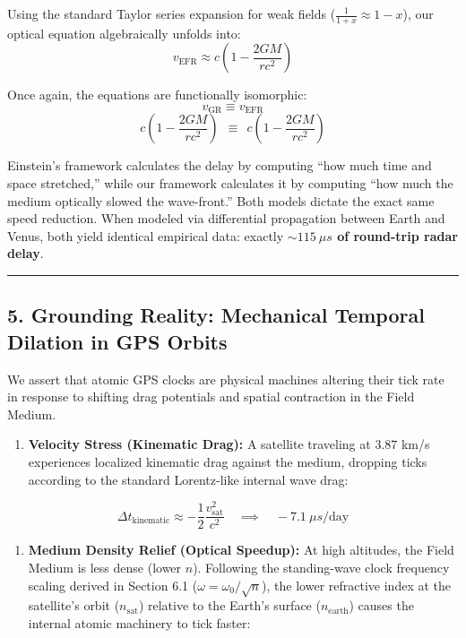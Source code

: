 \documentclass[twocolumn]{article}
\providecommand{\tightlist}{%
  \setlength{\itemsep}{0pt}\setlength{\parskip}{0pt}}
\begin{document}
Using the standard Taylor series expansion for weak fields
(\(\frac{1}{1+x} \approx 1-x\)), our optical equation algebraically
unfolds into:
\[ v_{\text{EFR}} \approx c \left( 1 - \frac{2GM}{rc^2} \right) \]

Once again, the equations are functionally isomorphic:
\[ v_{\text{GR}} \equiv v_{\text{EFR}} \]
\[ c \left( 1 - \frac{2GM}{rc^2} \right) \ \ \equiv \ \ c \left( 1 - \frac{2GM}{rc^2} \right) \]

Einstein's framework calculates the delay by computing ``how much time
and space stretched,'' while our framework calculates it by computing
``how much the medium optically slowed the wave-front.'' Both models
dictate the exact same speed reduction. When modeled via differential
propagation between Earth and Venus, both yield identical empirical
data: exactly \textbf{\(\sim 115 \ \mu s\) of round-trip radar delay}.

\begin{center}\rule{0.5\linewidth}{0.5pt}\end{center}

\subsection{5. Grounding Reality: Mechanical Temporal Dilation in GPS
Orbits}\label{grounding-reality-mechanical-temporal-dilation-in-gps-orbits}

We assert that atomic GPS clocks are physical machines altering their
tick rate in response to shifting drag potentials and spatial
contraction in the Field Medium.

\begin{enumerate}
\def\labelenumi{\arabic{enumi}.}
\tightlist
\item
  \textbf{Velocity Stress (Kinematic Drag):} A satellite traveling at
  \(3.87\) km/s experiences localized kinematic drag against the medium,
  dropping ticks according to the standard Lorentz-like internal wave
  drag:
\end{enumerate}

\[ \Delta t_{\text{kinematic}} \approx -\frac{1}{2} \frac{v_{\text{sat}}^2}{c^2} \quad \implies \quad -7.1 \ \mu s\text{/day} \]

\begin{enumerate}
\def\labelenumi{\arabic{enumi}.}
\setcounter{enumi}{1}
\tightlist
\item
  \textbf{Medium Density Relief (Optical Speedup):} At high altitudes,
  the Field Medium is less dense (lower \(n\)). Following the
  standing-wave clock frequency scaling derived in Section 6.1
  (\(\omega = \omega_0 / \sqrt{n}\)), the lower refractive index at the
  satellite's orbit (\(n_{\text{sat}}\)) relative to the Earth's surface
  (\(n_{\text{earth}}\)) causes the internal atomic machinery to tick
  faster:
\end{enumerate}
\end{document}
